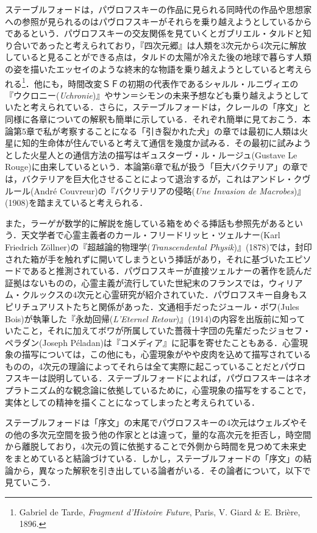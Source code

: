 ステーブルフォードは，パヴロフスキーの作品に見られる同時代の作品や思想家への参照が見られるのはパヴロフスキーがそれらを乗り越えようとしているからであるという．パヴロフスキーの交友関係を見ていくとガブリエル・タルドと知り合いであったと考えられており，『四次元郷』は人類を3次元から4次元に解放していると見ることができる点は，タルドの太陽が冷えた後の地球で暮らす人類の姿を描いたエッセイのような終末的な物語を乗り越えようとしていると考えられる\footnote{Gabriel de Tarde, \emph{Fragment d'Histoire Future}, Paris, V. Giard \& E. Brière, 1896.}．他にも，時間改変ＳＦの初期の代表作であるシャルル・ルニヴィエの『ウクロニー(\emph{Uchronie})』やサン＝シモンの未来予想なども乗り越えようとしていたと考えられている．さらに，ステーブルフォードは，クレールの「序文」と同様に各章についての解釈も簡単に示している．それぞれ簡単に見ておこう．本論第5章で私が考察することになる「引き裂かれた犬」の章では最初に人類は火星に知的生命体が住んでいると考えて通信を幾度か試みる．その最初に試みようとした火星人との通信方法の描写はギュスターヴ・ル・ルージュ(Gustave Le Rouge)に由来しているという．本論第6章で私が扱う「巨大バクテリア」の章では，バクテリアを巨大化させることによって退治するが，これはアンドレ・クヴルール(André Couvreur)の『バクリテリアの侵略(\emph{Une Invasion de Macrobes})』(1908)を踏まえていると考えられる．

また，ラーゲが数学的に解説を施している箱をめぐる挿話も参照先があるという．天文学者で心霊主義者のカール・フリードリッヒ・ツェルナー(Karl Friedrich Zöllner)の『超越論的物理学(\emph{Transcendental Physik})』(1878)では，封印された箱が手を触れずに開いてしまうという挿話があり，それに基づいたエピソードであると推測されている．パヴロフスキーが直接ツェルナーの著作を読んだ証拠はないものの，心霊主義が流行していた世紀末のフランスでは，ウィリアム・クルックスの4次元と心霊研究が紹介されていた．パヴロフスキー自身もスピリチュアリストたちと関係があった．文通相手だったジュール・ボワ(Jules Bois)が執筆した『永劫回帰(\emph{L'Eternel Retour})』(1914)の内容を出版前に知っていたこと，それに加えてボワが所属していた薔薇十字団の先輩だったジョセフ・ペラダン(Joseph Péladan)は『コメディア』に記事を寄せたこともある．心霊現象の描写については，この他にも，心霊現象がやや皮肉を込めて描写されているものの，4次元の理論によってそれらは全て実際に起こっていることだとパヴロフスキーは説明している．ステーブルフォードによれば，パヴロフスキーはネオプラトニズム的な観念論に依拠しているために，心霊現象の描写をすることで，実体としての精神を描くことになってしまったと考えられている．

ステーブルフォードは「序文」の末尾でパヴロフスキーの4次元はウェルズやその他の多次元空間を扱う他の作家ととは違って，量的な高次元を拒否し，時空間から離脱しており，4次元の質に依拠することで外側から時間を見つめて未来史をまとめていると結論づけている．しかし，ステーブルフォードの「序文」の結論から，異なった解釈を引き出している論者がいる．その論者について，以下で見ていこう．

